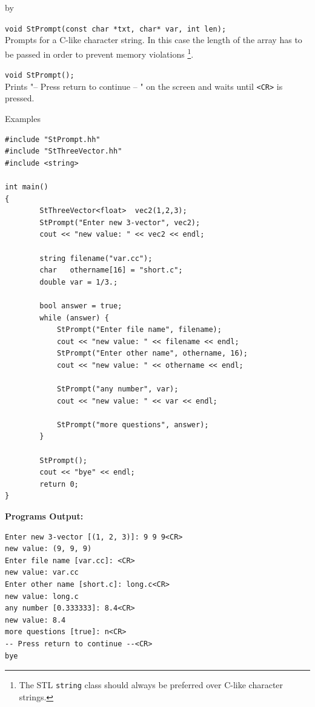 \documentclass[twoside]{article}
\newcommand{\comp}[1]{\texttt{#1}}%
\newcommand{\entrylabel}[1]{\mbox{\textbf{{#1}}}\hfil}%
\newenvironment{entry}
{\begin{list}{}%
    {\renewcommand{\makelabel}{\entrylabel}%
     \setlength{\labelwidth}{90pt}%
     \setlength{\leftmargin}{\labelwidth}
     \advance\leftmargin by \labelsep%
      }%
    }%
  {\end{list}}
\newcommand{\Entrylabel}[1]%
{\raisebox{0pt}[1ex][0pt]{\makebox[\labelwidth][l]%
    {\parbox[t]{\labelwidth}{\hspace{0pt}\textbf{{#1}}}}}}
\newenvironment{Entry}%
{\renewcommand{\entrylabel}{\Entrylabel}\begin{entry}}%
  {\end{entry}}
\begin{document}
\begin{Entry}
    \verb+void StPrompt(const char *txt, char* var, int len);+\\
    Prompts for a C-like character string. In this case the length
    of the array has to be passed in order to prevent memory violations
    \footnote{The STL \comp{string} class should always be preferred
        over C-like character strings.}.
    
    \verb+void StPrompt();+\\
    Prints "-- Press return to continue -- " on the screen and waits
    until \verb+<CR>+ is pressed. 
    
\item[Examples]
{\footnotesize
\begin{verbatim}
#include "StPrompt.hh"
#include "StThreeVector.hh"
#include <string>

int main()
{
        StThreeVector<float>  vec2(1,2,3);
        StPrompt("Enter new 3-vector", vec2);
        cout << "new value: " << vec2 << endl;

        string filename("var.cc");
        char   othername[16] = "short.c";
        double var = 1/3.;
        
        bool answer = true;
        while (answer) {
            StPrompt("Enter file name", filename);
            cout << "new value: " << filename << endl;
            StPrompt("Enter other name", othername, 16);
            cout << "new value: " << othername << endl;

            StPrompt("any number", var);
            cout << "new value: " << var << endl;
            
            StPrompt("more questions", answer);
        }
        
        StPrompt();
        cout << "bye" << endl;
        return 0;
}
\end{verbatim}
{\bf Programs Output:}
\begin{verbatim}
Enter new 3-vector [(1, 2, 3)]: 9 9 9<CR>
new value: (9, 9, 9)
Enter file name [var.cc]: <CR>
new value: var.cc
Enter other name [short.c]: long.c<CR>
new value: long.c
any number [0.333333]: 8.4<CR>
new value: 8.4
more questions [true]: n<CR>
-- Press return to continue --<CR> 
bye
\end{verbatim}
}
   
\end{Entry}
\clearpage

%
%
\end{document}
